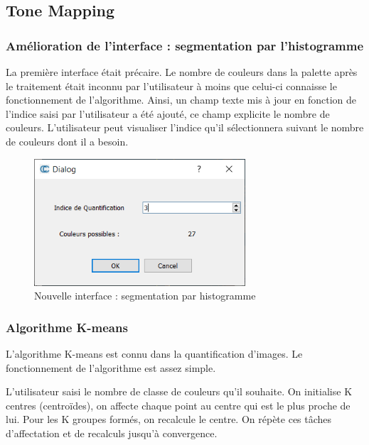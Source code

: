 \documentclass[12pt,titlepage,french]{article}
\begin{document}
\subsection{Tone Mapping}

\subsubsection{Amélioration de l'interface : segmentation par l'histogramme}

La première interface était précaire.
Le nombre de couleurs dans la palette après le traitement était inconnu par l'utilisateur à moins que celui-ci connaisse le fonctionnement de l'algorithme.
Ainsi, un champ texte mis à jour en fonction de l'indice saisi par l'utilisateur a été ajouté, ce champ explicite le nombre de couleurs.
L'utilisateur peut visualiser l'indice qu'il sélectionnera suivant le nombre de couleurs dont il a besoin.

\begin{figure}[H]
 \caption{\label{} Nouvelle interface : segmentation par histogramme}
 \begin{center}
 \includegraphics[width=0.7\textwidth]{./img/HistogramDialog.PNG}
  \end{center}
\end{figure}

\subsubsection{Algorithme K-means}

L'algorithme K-means est connu dans la quantification d'images.
Le fonctionnement de l'algorithme est assez simple.

L'utilisateur saisi le nombre de classe de couleurs qu'il souhaite.
On initialise K centres (centroïdes), on affecte chaque point au centre qui est le plus proche de lui.
Pour les K groupes formés, on recalcule le centre. On répète ces tâches d'affectation et de recalculs jusqu'à convergence.
\end{document}
